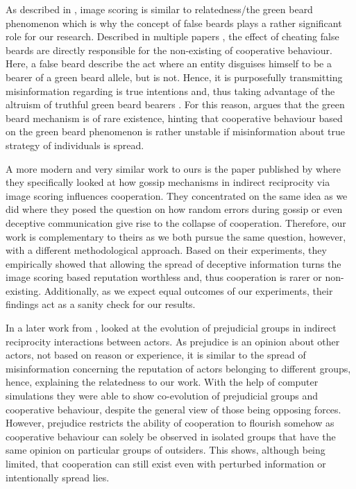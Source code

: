 \documentclass[sigconf]{acmart}
\begin{document}
    As described in , image scoring is similar to relatedness/the green beard phenomenon which is why the concept of false beards plays a rather significant role for our research.
    Described in multiple papers \cite{SelfishGeneRichard,roberts_kin_2019,west_altruism_2010}, the effect of cheating false beards are directly responsible for the non-existing of cooperative behaviour.
    Here, a false beard describe the act where an entity disguises himself to be a bearer of a green beard allele, but is not.
    Hence, it is purposefully transmitting misinformation regarding is true intentions and, thus taking advantage of the altruism of truthful green beard bearers \cite{SelfishGeneRichard}.
    For this reason, \citeauthor{SelfishGeneRichard} \cite{SelfishGeneRichard} argues that the green beard mechanism is of rare existence, hinting that cooperative behaviour based on the green beard phenomenon is rather unstable if misinformation about true strategy of individuals is spread.

    A more modern and very similar work to ours is the paper published by \citeauthor{szamado_deception_2016} \cite{szamado_deception_2016} where they specifically looked at how gossip mechanisms in indirect reciprocity via image scoring influences cooperation.
    They concentrated on the same idea as we did where they posed the question on how random errors during gossip or even deceptive communication give rise to the collapse of cooperation.
    Therefore, our work is complementary to theirs as we both pursue the same question, however, with a different methodological approach.
    Based on their experiments, they empirically showed that allowing the spread of deceptive information turns the image scoring based reputation worthless and, thus cooperation is rarer or non-existing.
    Additionally, as we expect equal outcomes of our experiments, their findings act as a sanity check for our results.

    In a later work from \citeyear{whitaker_indirect_2018}, \citeauthor{whitaker_indirect_2018} \cite{whitaker_indirect_2018} looked at the evolution of prejudicial groups in indirect reciprocity interactions between actors.
    As prejudice is an opinion about other actors, not based on reason or experience, it is similar to the spread of misinformation concerning the reputation of actors belonging to different groups, hence, explaining the relatedness to our work.
    With the help of computer simulations they were able to show co-evolution of prejudicial groups and cooperative behaviour, despite the general view of those being opposing forces.
    However, prejudice restricts the ability of cooperation to flourish somehow as cooperative behaviour can solely be observed in isolated groups that have the same opinion on particular groups of outsiders.
    This shows, although being limited, that cooperation can still exist even with perturbed information or intentionally spread lies.
\end{document}
